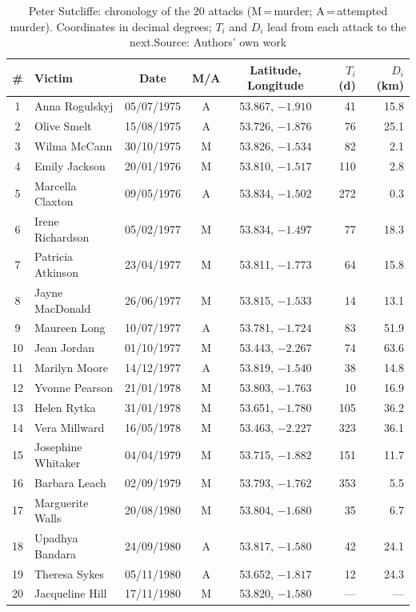 \documentclass[11pt,a4paper]{article}
\begin{document}
\begin{table}[htbp]
\centering\small
\caption{Peter Sutcliffe: chronology of the 20 attacks (M\,=\,murder; A\,=\,attempted murder). Coordinates in decimal degrees; $T_i$ and $D_i$ lead from each attack to the next.\newline Source: Authors' own work}
\begin{tabular}{clcccrr}
\toprule
\# & Victim & Date & M/A & Latitude, Longitude & $T_i$ (d) & $D_i$ (km)\\
\midrule
1 & Anna Rogulskyj & 05/07/1975 & A & 53.867, $-1.910$ & 41 & 15.8\\
2 & Olive Smelt & 15/08/1975 & A & 53.726, $-1.876$ & 76 & 25.1\\
3 & Wilma McCann & 30/10/1975 & M & 53.826, $-1.534$ & 82 & 2.1\\
4 & Emily Jackson & 20/01/1976 & M & 53.810, $-1.517$ & 110 & 2.8\\
5 & Marcella Claxton & 09/05/1976 & A & 53.834, $-1.502$ & 272 & 0.3\\
6 & Irene Richardson & 05/02/1977 & M & 53.834, $-1.497$ & 77 & 18.3\\
7 & Patricia Atkinson & 23/04/1977 & M & 53.811, $-1.773$ & 64 & 15.8\\
8 & Jayne MacDonald & 26/06/1977 & M & 53.815, $-1.533$ & 14 & 13.1\\
9 & Maureen Long & 10/07/1977 & A & 53.781, $-1.724$ & 83 & 51.9\\
10 & Jean Jordan & 01/10/1977 & M & 53.443, $-2.267$ & 74 & 63.6\\
11 & Marilyn Moore & 14/12/1977 & A & 53.819, $-1.540$ & 38 & 14.8\\
12 & Yvonne Pearson & 21/01/1978 & M & 53.803, $-1.763$ & 10 & 16.9\\
13 & Helen Rytka & 31/01/1978 & M & 53.651, $-1.780$ & 105 & 36.2\\
14 & Vera Millward & 16/05/1978 & M & 53.463, $-2.227$ & 323 & 36.1\\
15 & Josephine Whitaker & 04/04/1979 & M & 53.715, $-1.882$ & 151 & 11.7\\
16 & Barbara Leach & 02/09/1979 & M & 53.793, $-1.762$ & 353 & 5.5\\
17 & Marguerite Walls & 20/08/1980 & M & 53.804, $-1.680$ & 35 & 6.7\\
18 & Upadhya Bandara & 24/09/1980 & A & 53.817, $-1.580$ & 42 & 24.1\\
19 & Theresa Sykes & 05/11/1980 & A & 53.652, $-1.817$ & 12 & 24.3\\
20 & Jacqueline Hill & 17/11/1980 & M & 53.820, $-1.580$ & --- & ---\\
\bottomrule
\end{tabular}
\end{table}
\end{document}
